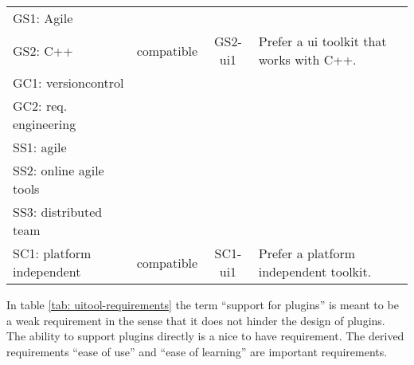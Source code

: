 \begin{center}
\begin{longtable}{ll||cp{13em}}
        GS1: Agile	          &              &          & \\
        GS2: C++	          & compatible   & GS2-ui1  & Prefer a ui toolkit that works with C++.\\
        GC1: versioncontrol       &              &          & \\
        GC2: req. engineering     &              &          & \\
        \hline
        SS1: agile	          &              &          & \\
        SS2: online agile tools   &              &          & \\
        SS3: distributed team     &              &          & \\
        SC1: platform independent & compatible	 & SC1-ui1  & Prefer a platform independent toolkit.\\
    \end{longtable}
    \label{tab: uitool-requirements}
\end{center}

In table \ref{tab: uitool-requirements} the term ``support for plugins''
is meant to be a weak requirement in the sense that it does not hinder
the design of plugins. The ability to support plugins directly is a nice
to have requirement. The derived requirements ``ease of use'' and ``ease of
learning'' are important requirements.
